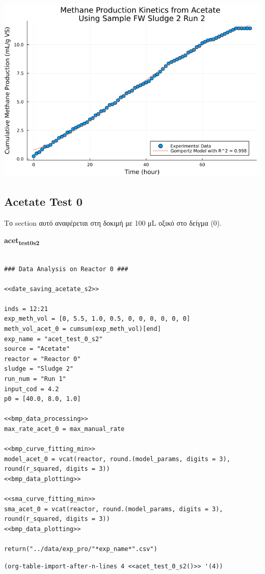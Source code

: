 \documentclass[11pt]{article}
\begin{document}
\begin{center}
\includegraphics[width=.9\linewidth]{../plots/BMPs/Acetate/specific_methane_kinetics_acet_test_fw_s2_2_hour.png}
\end{center}

\subsection{Acetate Test 0}
\label{sec:org3747142}
Το section αυτό αναφέρεται στη δοκιμή με 100 μL οξικό στο δείγμα (0).

\textbf{acet\textsubscript{test}\textsubscript{0}\textsubscript{s2}}
\begin{verbatim}

### Data Analysis on Reactor 0 ###

<<date_saving_acetate_s2>>

inds = 12:21
exp_meth_vol = [0, 5.5, 1.0, 0.5, 0, 0, 0, 0, 0, 0]
meth_vol_acet_0 = cumsum(exp_meth_vol)[end]
exp_name = "acet_test_0_s2"
source = "Acetate"
reactor = "Reactor 0"
sludge = "Sludge 2"
run_num = "Run 1"
input_cod = 4.2
p0 = [40.0, 8.0, 1.0]

<<bmp_data_processing>>
max_rate_acet_0 = max_manual_rate

<<bmp_curve_fitting_min>>
model_acet_0 = vcat(reactor, round.(model_params, digits = 3), round(r_squared, digits = 3))
<<bmp_data_plotting>>

<<sma_curve_fitting_min>>
sma_acet_0 = vcat(reactor, round.(model_params, digits = 3), round(r_squared, digits = 3))  
<<bmp_data_plotting>>

return("../data/exp_pro/"*exp_name*".csv")
\end{verbatim}

\begin{verbatim}
(org-table-import-after-n-lines 4 <<acet_test_0_s2()>> '(4))
\end{verbatim}
\end{document}
